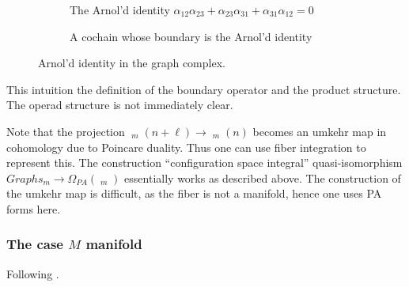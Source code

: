 \documentclass{scrartcl}
\theoremstyle{plain}
\theoremstyle{definition}
\DeclareMathOperator{\cConf}{\overline{Conf}}
\begin{document}
\begin{figure}[ht]
    \centering
    \begin{subfigure}[b]{0.65\textwidth}
        \centering
        
        \caption{The Arnol'd identity $\alpha_{12}\alpha_{23} + \alpha_{23}\alpha_{31} + \alpha_{31}\alpha_{12} = 0$}
    \end{subfigure}
    \hfill
    \begin{subfigure}[b]{0.3\textwidth}
        \centering
        
        \caption{A cochain whose boundary is the Arnol'd identity}
    \end{subfigure} 
    \caption{Arnol'd identity in the graph complex. }\label{graph-complex-ex}
\end{figure}

This intuition the definition of the boundary operator and the product structure. The operad structure is not immediately clear. 

Note that the projection $\cConf_m(n+\ell) \to \cConf_m(n)$ becomes an umkehr map in cohomology due to Poincare duality. Thus one can use fiber integration to represent this. The construction ``configuration space integral'' quasi-isomorphism $Graphs_m \to \Omega_{PA}(\cConf_m)$ essentially works as described above. The construction of the umkehr map is difficult, as the fiber is not a manifold, hence one uses PA forms here. 

\subsubsection{The case $M$ manifold}

Following \cite{campos2016model}. 



\end{document}
